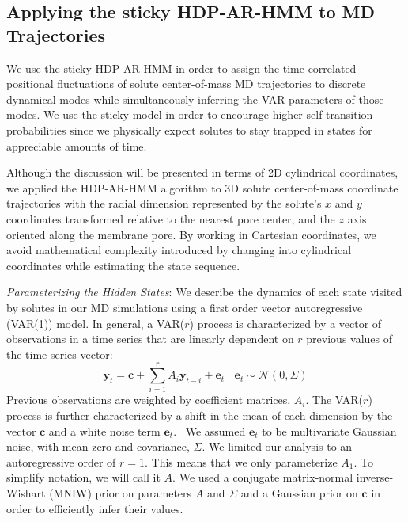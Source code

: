 \documentclass[journal=jpcbfk,manuscript=article]{achemso}
\begin{document}
  \subsection{Applying the sticky HDP-AR-HMM to MD Trajectories}\label{method:HDP-AR-HMM}

  We use the sticky HDP-AR-HMM in order to assign the time-correlated positional 
  fluctuations of solute center-of-mass MD trajectories to discrete dynamical modes while 
  simultaneously inferring the VAR parameters of those modes. We use the sticky model
  in order to encourage higher self-transition probabilities since we physically expect
  solutes to stay trapped in states for appreciable amounts of time. 
  
  Although the discussion will be presented in terms of 2D cylindrical coordinates, we
  applied the HDP-AR-HMM algorithm to 3D solute center-of-mass coordinate trajectories 
  with the radial dimension represented by the solute's $x$ and $y$ coordinates 
  transformed relative to the nearest pore center, and the $z$ axis oriented along 
  the membrane pore. By working in Cartesian coordinates, we avoid mathematical 
  complexity introduced by changing into cylindrical coordinates while
  estimating the state sequence.
  
  \textit{Parameterizing the Hidden States}: We describe the dynamics of each 
  state visited by solutes in our MD simulations using a first order vector 
  autoregressive (VAR(1)) model. In general, a VAR($r$) process is characterized by a
  vector of observations in a time series that are linearly dependent on $r$ previous
  values of the time series vector:
  \begin{equation}
  	\mathbf{y}_t = \mathbf{c} + \sum_{i=1}^r A_i\mathbf{y}_{t-i} + \mathbf{e}_t~~~~\mathbf{e}_t \sim \mathcal{N}(0, \Sigma)
  \label{eqn:var}
  \end{equation}
  Previous observations are weighted by coefficient matrices, $A_i$. The VAR($r$) 
  process is further characterized by a shift in the mean of each dimension by the
  vector $\mathbf{c}$ and a white noise term $\mathbf{e}_t$.~\cite{hamilton_time_1994}
  We assumed $\mathbf{e}_t$ to be multivariate Gaussian noise, with mean zero and
  covariance, $\Sigma$. We limited our analysis to an autoregressive order of $r=1$.
  This means that we only parameterize $A_1$. To simplify notation, we will call it $A$. 
  We used a conjugate matrix-normal inverse-Wishart (MNIW) prior on parameters 
  $A$ and $\Sigma$ and a Gaussian prior on $\mathbf{c}$ in order to efficiently infer their 
  values.~\cite{fox_nonparametric_2009}
  
\end{document}

